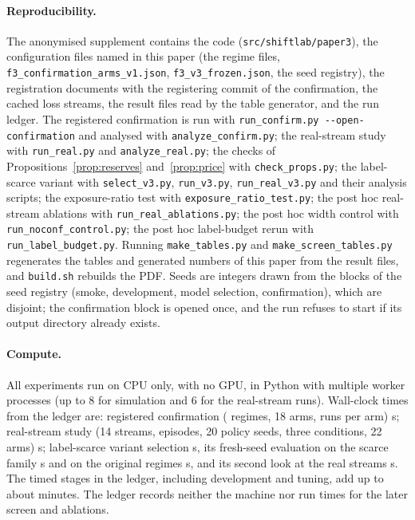 \documentclass[10pt]{article}
\theoremstyle{plain}
\theoremstyle{definition}
\begin{document}
\paragraph{Reproducibility.}
The anonymised supplement contains the code (\texttt{src/shiftlab/paper3}), the configuration files named in this paper (the regime files, \texttt{f3\_confirmation\_arms\_v1.json}, \texttt{f3\_v3\_frozen.json}, the seed registry), the registration documents with the registering commit of the confirmation, the cached loss streams, the result files read by the table generator, and the run ledger. The registered confirmation is run with \texttt{run\_confirm.py -{}-open-confirmation} and analysed with \texttt{analyze\_confirm.py}; the real-stream study with \texttt{run\_real.py} and \texttt{analyze\_real.py}; the checks of Propositions~\ref{prop:reserves} and~\ref{prop:price} with \texttt{check\_props.py}; the label-scarce variant with \texttt{select\_v3.py}, \texttt{run\_v3.py}, \texttt{run\_real\_v3.py} and their analysis scripts; the exposure-ratio test with \texttt{exposure\_ratio\_test.py}; the post hoc real-stream ablations with \texttt{run\_real\_ablations.py}; the post hoc width control with \texttt{run\_noconf\_control.py}; the post hoc label-budget rerun with \texttt{run\_label\_budget.py}. Running \texttt{make\_tables.py} and \texttt{make\_screen\_tables.py} regenerates the tables and generated numbers of this paper from the result files, and \texttt{build.sh} rebuilds the PDF. Seeds are integers drawn from the blocks of the seed registry (smoke, development, model selection, confirmation), which are disjoint; the confirmation block is opened once, and the run refuses to start if its output directory already exists.

\paragraph{Compute.}
All experiments run on CPU only, with no GPU, in Python with multiple worker processes (up to $8$ for simulation and $6$ for the real-stream runs). Wall-clock times from the ledger are: registered confirmation (\NRegimes{} regimes, 18 arms, \NRunsPerArm{} runs per arm) \WallConfirm{} s; real-stream study (14 streams, \NStreamEpisodes{} episodes, 20 policy seeds, three conditions, 22 arms) \WallReal{} s; label-scarce variant selection \WallVSel{} s, its fresh-seed evaluation on the scarce family \WallVScarce{} s and on the original regimes \WallVOrig{} s, and its second look at the real streams \WallVReal{} s. The \NLedgerStages{} timed stages in the ledger, including development and tuning, add up to about \WallTotalMin{} minutes. The ledger records neither the machine nor run times for the later screen and ablations.
\end{document}
